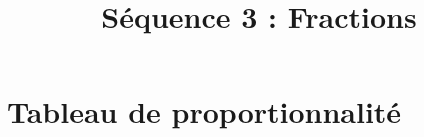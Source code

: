 \documentclass[xcolor={dvipsnames}]{beamer}
\title{Séquence 3 : Fractions}
\begin{document}
	
	
	
	\begin{frame}
		\titlepage 
	\end{frame}
	
	
	
	
	
	\section{Tableau de proportionnalité}
	
\end{document}

